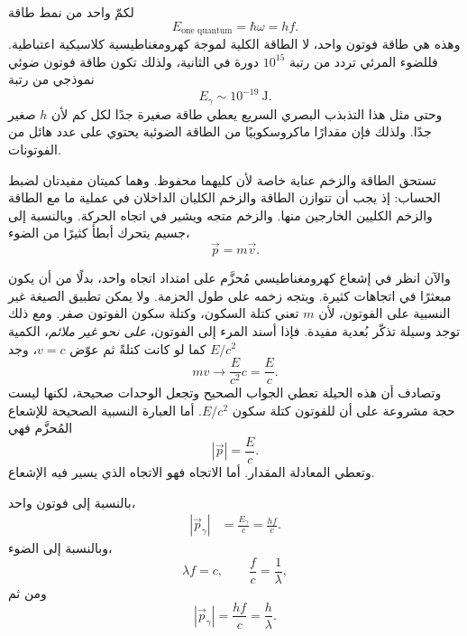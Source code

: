 لكمّ واحد من نمط طاقة
\begin{equation}
E_{\text{one quantum}}=\hbar\omega=hf.
\end{equation}
وهذه هي طاقة فوتون واحد، لا الطاقة الكلية لموجة كهرومغناطيسية كلاسيكية اعتباطية. فللضوء المرئي تردد من رتبة \(10^{15}\) دورة في الثانية، ولذلك تكون طاقة فوتون ضوئي نموذجي من رتبة
\begin{equation}
E_\gamma\sim 10^{-19}\ \mathrm{J}.
\end{equation}
وحتى مثل هذا التذبذب البصري السريع يعطي طاقة صغيرة جدًا لكل كم لأن \(h\) صغير جدًا. ولذلك فإن مقدارًا ماكروسكوبيًا من الطاقة الضوئية يحتوي على عدد هائل من الفوتونات.

تستحق الطاقة والزخم عناية خاصة لأن كليهما محفوظ. وهما كميتان مفيدتان لضبط الحساب: إذ يجب أن تتوازن الطاقة والزخم الكليان الداخلان في عملية ما مع الطاقة والزخم الكليين الخارجين منها. والزخم متجه ويشير في اتجاه الحركة. وبالنسبة إلى جسيم يتحرك أبطأ كثيرًا من الضوء،
\begin{equation}
\vec p=m\vec v.
\end{equation}

والآن انظر في إشعاع كهرومغناطيسي مُحزَّم على امتداد اتجاه واحد، بدلًا من أن يكون مبعثرًا في اتجاهات كثيرة. ويتجه زخمه على طول الحزمة. ولا يمكن تطبيق الصيغة غير النسبية على الفوتون، لأن \(m\) تعني كتلة السكون، وكتلة سكون الفوتون صفر. ومع ذلك توجد وسيلة تذكّر بُعدية مفيدة. فإذا أسند المرء إلى الفوتون، \emph{على نحو غير ملائم}، الكمية \(E/c^2\) كما لو كانت كتلةً ثم عوّض \(v=c\)، وجد
\begin{equation}
mv\longrightarrow \frac{E}{c^2}c=\frac{E}{c}.
\end{equation}
وتصادف أن هذه الحيلة تعطي الجواب الصحيح وتجعل الوحدات صحيحة، لكنها ليست حجة مشروعة على أن للفوتون كتلة سكون \(E/c^2\). أما العبارة النسبية الصحيحة للإشعاع المُحزَّم فهي
\begin{equation}
|\vec p|=\frac{E}{c}.
\end{equation}
وتعطي المعادلة المقدار. أما الاتجاه فهو الاتجاه الذي يسير فيه الإشعاع.

بالنسبة إلى فوتون واحد،
\begin{align}
|\vec p_\gamma|
&=\frac{E_\gamma}{c}
=\frac{hf}{c}.
\end{align}
وبالنسبة إلى الضوء،
\begin{equation}
\lambda f=c,
\qquad
\frac{f}{c}=\frac{1}{\lambda},
\end{equation}
ومن ثم
\begin{equation}
|\vec p_\gamma|=\frac{hf}{c}=\frac{h}{\lambda}.
\end{equation}


